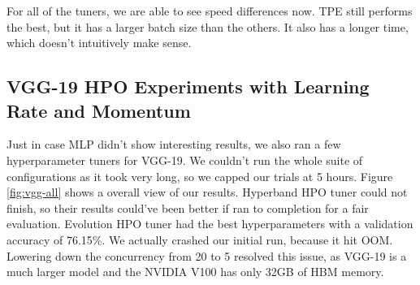 \documentclass{article}
\begin{document}
For all of the tuners, we are able to see speed differences now. TPE still performs the best, but it has a larger batch size than the others. It also has a longer time, which doesn't intuitively make sense.

\subsection{VGG-19 HPO Experiments with Learning Rate and Momentum}
Just in case MLP didn't show interesting results, we also ran a few hyperparameter tuners for VGG-19. We couldn't run the whole suite of configurations as it took very long, so we capped our trials at 5 hours. Figure \ref{fig:vgg-all} shows a overall view of our results. Hyperband HPO tuner could not finish, so their results could've been better if ran to completion for a fair evaluation. Evolution HPO tuner had the best hyperparameters with a validation accuracy of 76.15\%. We actually crashed our initial run, because it hit OOM. Lowering down the concurrency from 20 to 5 resolved this issue, as VGG-19 is a much larger model and the NVIDIA V100 has only 32GB of HBM memory.
\end{document}
